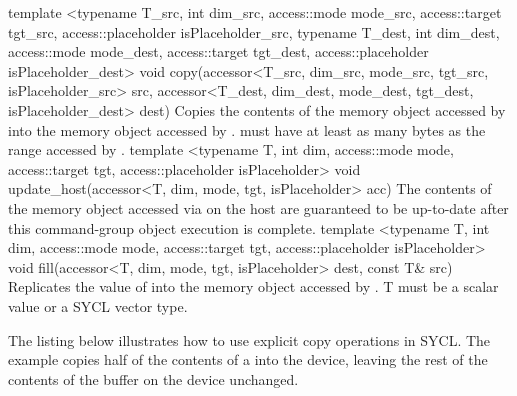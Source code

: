   \addRowTwoL
    {template <typename T_src, int dim_src, access::mode mode_src, access::target tgt_src, access::placeholder isPlaceholder_src, typename T_dest, int dim_dest, access::mode mode_dest, access::target tgt_dest, access::placeholder isPlaceholder_dest>}
    {void copy(accessor<T_src, dim_src, mode_src, tgt_src, isPlaceholder_src> src, accessor<T_dest, dim_dest, mode_dest, tgt_dest, isPlaceholder_dest> dest)}
    { Copies the contents of the memory object accessed by 
      into the memory object accessed by .
       must have at least as many bytes as the
      range accessed by .}
  \addRowTwoL
    {template <typename T, int dim, access::mode mode, access::target tgt, access::placeholder isPlaceholder>}
    {void update_host(accessor<T, dim, mode, tgt, isPlaceholder> acc)}
    { The contents of the memory object accessed via 
      on the host are guaranteed to be up-to-date after this
      \gls{command-group} object execution is complete.}
  \addRowThreeL
    {template <typename T, int dim, access::mode mode, access::target tgt, access::placeholder isPlaceholder>}
    {void fill(accessor<T, dim, mode, tgt, isPlaceholder> dest,}
    {          const T\& src)}
    {Replicates the value of  into the
      memory object accessed by .
      T must be a scalar value or a SYCL vector type.
    }

\completeTable

The listing below illustrates how to use explicit copy
operations in SYCL. The example copies half of the contents of
a  into the device, leaving the rest of the
contents of the buffer on the device unchanged.



